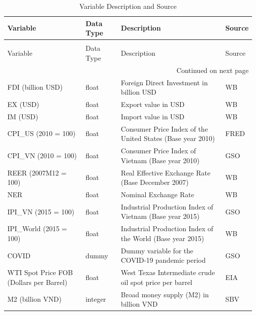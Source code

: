 \begin{longtable}{llll}
\caption{Variable Description and Source} \label{tab:var_desc_source} \\
\toprule
Variable & Data Type & Description & Source \\
\midrule
\endfirsthead
\caption[]{Variable Description and Source} \\
\toprule
Variable & Data Type & Description & Source \\
\midrule
\endhead
\midrule
\multicolumn{4}{r}{Continued on next page} \\
\midrule
\endfoot
\bottomrule
\endlastfoot
FDI (billion USD) & float & Foreign Direct Investment in billion USD & WB \\
EX (USD) & float & Export value in USD & WB \\
IM (USD) & float & Import value in USD & WB \\
CPI\_US (2010 = 100) & float & Consumer Price Index of the United States (Base year 2010) & FRED \\
CPI\_VN (2010 = 100) & float & Consumer Price Index of Vietnam (Base year 2010) & GSO \\
REER (2007M12 = 100) & float & Real Effective Exchange Rate (Base December 2007) & WB \\
NER & float & Nominal Exchange Rate & WB \\
IPI\_VN (2015 = 100) & float & Industrial Production Index of Vietnam (Base year 2015) & GSO \\
IPI\_World (2015 = 100) & float & Industrial Production Index of the World (Base year 2015) & WB \\
COVID & dummy & Dummy variable for the COVID-19 pandemic period & GSO \\
WTI Spot Price FOB (Dollars per Barrel) & float & West Texas Intermediate crude oil spot price per barrel & EIA \\
M2 (billion VND) & integer & Broad money supply (M2) in billion VND & SBV \\
\end{longtable}
